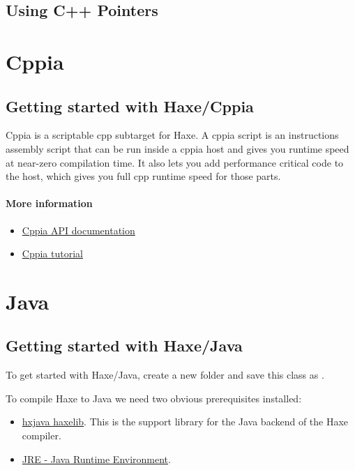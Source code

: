 \subsection{Using C++ Pointers}
\label{target-cpp-pointers}


\section{Cppia}
\label{target-cppia}


\subsection{Getting started with Haxe/Cppia}
\label{target-cppia-getting-started}

Cppia is a scriptable cpp subtarget for Haxe. A cppia script is an instructions assembly script that can be run inside a cppia host and gives you runtime speed at near-zero compilation time. It also lets you add performance critical code to the host, which gives you full cpp runtime speed for those parts.

\paragraph{More information}
\begin{itemize}
	\item \href{https://api.haxe.org/cpp/cppia/index.html}{Cppia API documentation}
	\item \href{https://code.haxe.org/category/other/working-with-cppia/index.html}{Cppia tutorial}
\end{itemize}

\section{Java}
\label{target-java}

\subsection{Getting started with Haxe/Java}
\label{target-java-getting-started}

To get started with Haxe/Java, create a new folder and save this class as .


To compile Haxe to Java we need two obvious prerequisites installed:

\begin{itemize}
	\item \href{http://lib.haxe.org/p/hxjava}{hxjava haxelib}. This is the support library for the Java backend of the Haxe compiler.
	\item \href{https://java.com/download/}{JRE - Java Runtime Environment}.
\end{itemize}


